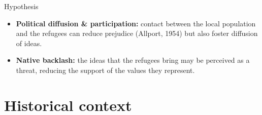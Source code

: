 \documentclass[aspectratio=169]{beamer}
\begin{document}
\begin{frame}[label=Hypothesis]{Hypothesis}



\begin{itemize}
    \item \textbf{Political diffusion \& participation:} contact between the local population and the refugees can reduce prejudice (Allport, 1954) but also foster diffusion of ideas. \hyperlink{Presse2}{}
    \vspace{0.4cm}
    \item \textbf{Native backlash:} the ideas that the refugees bring may be perceived as a threat, reducing the support of the values they represent. \hyperlink{Presse1}{}
\end{itemize}

\end{frame}




\section{Historical context}
\end{document}
